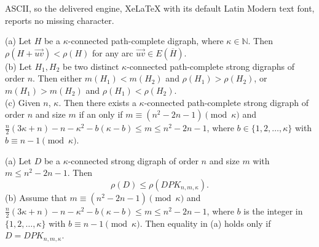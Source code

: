 \documentclass[10pt,a4paper]{amsart}
\begin{document}
ASCII, so the delivered engine, XeLaTeX with its default Latin Modern text font, reports no missing character.
\begin{lemma}\label{la:size-vs-remoteness-in-kappa-connected-pc-digraph}
	(a) Let $H$ be a $\kappa$-connected path-complete digraph, where $\kappa \in \mathbb{N}$. Then 
$\rho(H+\overrightarrow{uv}) < \rho(H)$ for any arc $ \overrightarrow{uv} \in E(\overline{H})$. \\
(b) Let $H_1, H_2$ be two distinct $\kappa$-connected path-complete strong digraphs of order $n$. Then either $m(H_1) < m(H_2)$ and $\rho(H_1) > \rho(H_2)$, or $m(H_1) > m(H_2)$ 
and $\rho(H_1) < \rho(H_2)$. \\
 (c) Given $n$, $\kappa$. Then there exists a $\kappa$-connected path-complete strong digraph of order $n$ and size $m$ if an only if $m \equiv (n^2-2n-1) \pmod{\kappa} $ and $ \frac{n}{2}(3\kappa+n)-n-\kappa^2-b(\kappa-b) \leq m \leq n^2-2n-1$, where $b \in \{1,2,\ldots, \kappa\}$ with
$b \equiv n-1 \pmod{\kappa}$.
\end{lemma}

	\begin{theorem}
(a) Let $D$ be a $\kappa$-connected strong digraph of order $n$ and size $m$ with $ m \leq n^2-2n-1$. Then 
	\begin{equation} \label{eq:bound-on-rho-for-kappa-digraph}
\rho(D) \leq \rho(DPK_{n,m,\kappa}).
\end{equation}
(b) Assume that $m \equiv (n^2-2n-1) \pmod{\kappa} $ and $ \frac{n}{2}(3\kappa+n)-n-\kappa^2-b(\kappa-b) \leq m \leq n^2-2n-1$, where $b$ is the integer in $\{1,2,\ldots, \kappa\}$ with
$b \equiv n-1 \pmod{\kappa}$. Then equality in (a) holds only if $D=DPK_{n,m,\kappa}$.
	\end{theorem}
\end{document}
